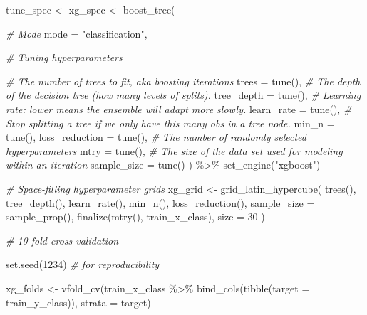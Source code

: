 \documentclass[
]{book}
\newenvironment{Shaded}{\begin{snugshade}}{\end{snugshade}}
\newcommand{\AttributeTok}[1]{\textcolor[rgb]{0.77,0.63,0.00}{#1}}
\newcommand{\CommentTok}[1]{\textcolor[rgb]{0.56,0.35,0.01}{\textit{#1}}}
\newcommand{\DecValTok}[1]{\textcolor[rgb]{0.00,0.00,0.81}{#1}}
\newcommand{\FunctionTok}[1]{\textcolor[rgb]{0.00,0.00,0.00}{#1}}
\newcommand{\NormalTok}[1]{#1}
\newcommand{\OtherTok}[1]{\textcolor[rgb]{0.56,0.35,0.01}{#1}}
\newcommand{\SpecialCharTok}[1]{\textcolor[rgb]{0.00,0.00,0.00}{#1}}
\newcommand{\StringTok}[1]{\textcolor[rgb]{0.31,0.60,0.02}{#1}}
\begin{document}
\begin{Shaded}
\begin{Highlighting}[]
\NormalTok{tune\_spec }\OtherTok{\textless{}{-}} 
\NormalTok{  xg\_spec }\OtherTok{\textless{}{-}} \FunctionTok{boost\_tree}\NormalTok{(}
  
           \CommentTok{\# Mode }
           \AttributeTok{mode =} \StringTok{"classification"}\NormalTok{,}
           
           \CommentTok{\# Tuning hyperparameters}
           
           \CommentTok{\# The number of trees to fit, aka boosting iterations}
           \AttributeTok{trees =} \FunctionTok{tune}\NormalTok{(),}
           \CommentTok{\# The depth of the decision tree (how many levels of splits).}
             \AttributeTok{tree\_depth =} \FunctionTok{tune}\NormalTok{(), }
           \CommentTok{\# Learning rate: lower means the ensemble will adapt more slowly.}
           \AttributeTok{learn\_rate =} \FunctionTok{tune}\NormalTok{(),}
           \CommentTok{\# Stop splitting a tree if we only have this many obs in a tree node.}
             \AttributeTok{min\_n =} \FunctionTok{tune}\NormalTok{(),}
           \AttributeTok{loss\_reduction =} \FunctionTok{tune}\NormalTok{(),}
           \CommentTok{\# The number of randomly selected hyperparameters }
           \AttributeTok{mtry =} \FunctionTok{tune}\NormalTok{(), }
           \CommentTok{\# The size of the data set used for modeling within an iteration}
           \AttributeTok{sample\_size =} \FunctionTok{tune}\NormalTok{()}
\NormalTok{          ) }\SpecialCharTok{\%\textgreater{}\%} 
  \FunctionTok{set\_engine}\NormalTok{(}\StringTok{"xgboost"}\NormalTok{) }

\CommentTok{\# Space{-}filling hyperparameter grids }
\NormalTok{xg\_grid }\OtherTok{\textless{}{-}} \FunctionTok{grid\_latin\_hypercube}\NormalTok{(}
  \FunctionTok{trees}\NormalTok{(),}
  \FunctionTok{tree\_depth}\NormalTok{(),}
  \FunctionTok{learn\_rate}\NormalTok{(),}
  \FunctionTok{min\_n}\NormalTok{(),}
  \FunctionTok{loss\_reduction}\NormalTok{(), }
  \AttributeTok{sample\_size =} \FunctionTok{sample\_prop}\NormalTok{(),}
  \FunctionTok{finalize}\NormalTok{(}\FunctionTok{mtry}\NormalTok{(), train\_x\_class),}
  \AttributeTok{size =} \DecValTok{30}
\NormalTok{  )}

\CommentTok{\# 10{-}fold cross{-}validation}

\FunctionTok{set.seed}\NormalTok{(}\DecValTok{1234}\NormalTok{) }\CommentTok{\# for reproducibility }

\NormalTok{xg\_folds }\OtherTok{\textless{}{-}} \FunctionTok{vfold\_cv}\NormalTok{(train\_x\_class }\SpecialCharTok{\%\textgreater{}\%} \FunctionTok{bind\_cols}\NormalTok{(}\FunctionTok{tibble}\NormalTok{(}\AttributeTok{target =}\NormalTok{ train\_y\_class)),}
                     \AttributeTok{strata =}\NormalTok{ target)}
\end{Highlighting}
\end{Shaded}
\end{document}
